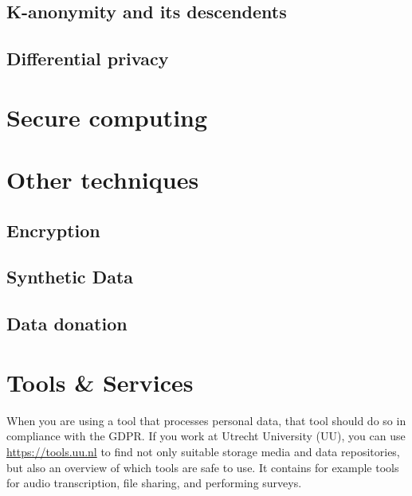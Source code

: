 \documentclass[
]{book}
\begin{document}
\hypertarget{k-anonymity-and-its-descendents}{%
\section{K-anonymity and its descendents}\label{k-anonymity-and-its-descendents}}

\hypertarget{differential-privacy}{%
\section{Differential privacy}\label{differential-privacy}}

\hypertarget{secure-computing}{%
\chapter{Secure computing}\label{secure-computing}}

\hypertarget{other-techniques}{%
\chapter{Other techniques}\label{other-techniques}}

\hypertarget{encryption}{%
\section{Encryption}\label{encryption}}

\hypertarget{synthetic-data}{%
\section{Synthetic Data}\label{synthetic-data}}

\hypertarget{data-donation}{%
\section{Data donation}\label{data-donation}}

\hypertarget{tools-and-services}{%
\chapter{Tools \& Services}\label{tools-and-services}}

When you are using a tool that processes personal data, that tool should do so
in compliance with the GDPR. If you work at Utrecht University (UU), you can use
\url{https://tools.uu.nl} to find not only suitable
storage media
and data repositories,
but also an
overview of which tools are safe to use.
It contains for example tools for audio transcription, file sharing, and performing
surveys.
\end{document}
